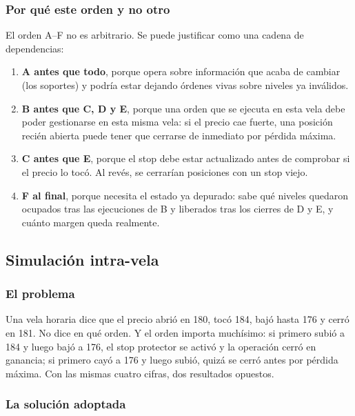 \documentclass[11pt,a4paper]{article}
\begin{document}
\subsubsection{Por qué este orden y no otro}

El orden A--F no es arbitrario. Se puede justificar como una cadena de dependencias:

\begin{enumerate}[leftmargin=1.6em,itemsep=2pt]
\item \textbf{A antes que todo}, porque opera sobre información que acaba de cambiar (los
soportes) y podría estar dejando órdenes vivas sobre niveles ya inválidos.
\item \textbf{B antes que C, D y E}, porque una orden que se ejecuta en esta vela debe poder
gestionarse en esta misma vela: si el precio cae fuerte, una posición recién abierta puede
tener que cerrarse de inmediato por pérdida máxima.
\item \textbf{C antes que E}, porque el stop debe estar actualizado antes de comprobar si el
precio lo tocó. Al revés, se cerrarían posiciones con un stop viejo.
\item \textbf{F al final}, porque necesita el estado ya depurado: sabe qué niveles quedaron
ocupados tras las ejecuciones de B y liberados tras los cierres de D y E, y cuánto margen
queda realmente.
\end{enumerate}

\subsection{Simulación intra-vela}
\label{sec:x4-intravela}

\subsubsection{El problema}

Una vela horaria dice que el precio abrió en 180, tocó 184, bajó hasta 176 y cerró en 181.
No dice en qué orden. Y el orden importa muchísimo: si primero subió a 184 y luego bajó a
176, el stop protector se activó y la operación cerró en ganancia; si primero cayó a 176 y
luego subió, quizá se cerró antes por pérdida máxima. Con las mismas cuatro cifras, dos
resultados opuestos.

\subsubsection{La solución adoptada}
\end{document}
